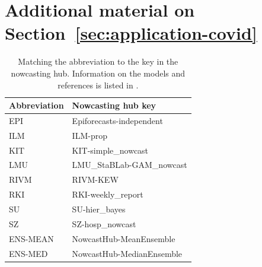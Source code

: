 \section{Additional material on Section~\ref{sec:application-covid}}\label{sec:appendix-application-covid}




\begin{table}
    \centering
    \begin{tabular}{l l}
        \toprule
        Abbreviation & Nowcasting hub key \\
        \midrule
        EPI & Epiforecasts-independent \\
        ILM & ILM-prop \\
        KIT & KIT-simple\_nowcast \\
        LMU & LMU\_StaBLab-GAM\_nowcast \\
        RIVM & RIVM-KEW \\
        RKI & RKI-weekly\_report \\
        SU & SU-hier\_bayes \\
        SZ & SZ-hosp\_nowcast\\
        ENS-MEAN & NowcastHub-MeanEnsemble\\
        ENS-MED & NowcastHub-MedianEnsemble\\
        \bottomrule
    \end{tabular}
    \caption{Matching the abbreviation to the key in the nowcasting hub.
    Information on the models and references is listed in \citet[][Table 1]{Wolffram2023}.}
    \label{tab:app-covid-models}
\end{table}


